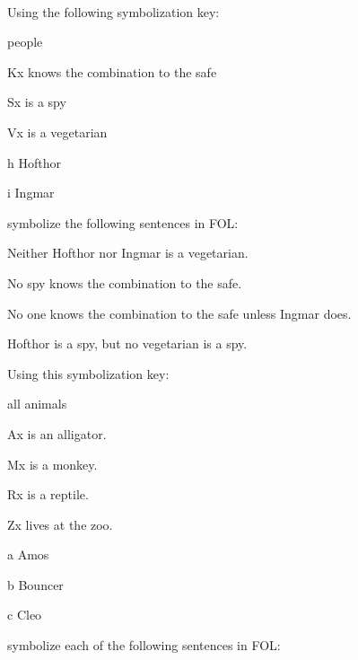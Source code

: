 \

\problempart
\label{pr.FOLvegetarians}
Using the following symbolization key:
\begin{ekey}
\item[\text{domain}] people
\item[Kx]  knows the combination to the safe
\item[Sx]  is a spy
\item[Vx]  is a vegetarian
\item[h] Hofthor
\item[i] Ingmar
\end{ekey}
symbolize the following sentences in FOL:
\begin{earg}
\item Neither Hofthor nor Ingmar is a vegetarian.
\item No spy knows the combination to the safe.
\item No one knows the combination to the safe unless Ingmar does.
\item Hofthor is a spy, but no vegetarian is a spy.
\end{earg}
\solutions
\problempart\label{pr.FOLalligators}
Using this symbolization key:
\begin{ekey}
\item[\text{domain}] all animals
\item[Ax]  is an alligator.
\item[Mx]  is a monkey.
\item[Rx]  is a reptile.
\item[Zx]  lives at the zoo.
\item[a] Amos
\item[b] Bouncer
\item[c] Cleo
\end{ekey}
symbolize each of the following sentences in FOL:
